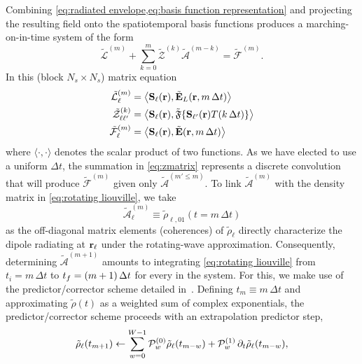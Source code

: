 Combining \cref{eq:radiated envelope,eq:basis function representation} and projecting the resulting field onto the spatiotemporal basis functions produces a marching-on-in-time system of the form
\begin{equation}
  \tilde{\mathcal{L}}^{(m)} + \sum_{k = 0}^{m} \tilde{\mathcal{Z}}^{(k)} \tilde{\mathcal{A}}^{(m - k)} = \tilde{\mathcal{F}}^{(m)}.
  \label{eq:zmatrix}
\end{equation}
In this (block $N_s \times N_s$) matrix equation
\begin{subequations}
  \begin{align}
    \tilde{\mathcal{L}}^{(m)}_{\ell} &= \big\langle \mathbf{S}_\ell(\vb{r}), \tilde{\vb{E}}_L(\vb{r}, m \, \Delta t) \big\rangle \\
    \tilde{\mathcal{Z}}^{(k)}_{\ell \ell'} &= \big\langle \mathbf{S}_\ell(\vb{r}), \tilde{\mathfrak{F}}\{ \mathbf{S}_{\ell'}(\mathbf{r}) T(k \, \Delta t) \} \big\rangle \\
    \tilde{\mathcal{F}}^{(m)}_\ell &= \big\langle \mathbf{S}_\ell(\vb{r}), \tilde{\mathbf{E}}(\vb{r}, m \, \Delta t) \big\rangle
  \end{align}
  \label{eq:projections}
\end{subequations}
where $\langle \cdot, \cdot \rangle$ denotes the scalar product of two functions.
As we have elected to use a uniform $\Delta t$, the summation in \cref{eq:zmatrix} represents a discrete convolution that will produce $\tilde{\mathcal{F}}^{(m)}$ given only $\tilde{\mathcal{A}}^{(m' \leqslant m)}$.
To link $\tilde{\mathcal{A}}^{(m)}$ with the density matrix in \cref{eq:rotating liouville}, we take
\begin{equation}
  \tilde{\mathcal{A}}^{(m)}_\ell \equiv \tilde{\rho}_{\ell, 01}(t = m \, \Delta t)
  \label{eq:polarization definition}
\end{equation}
as the off-diagonal matrix elements (coherences) of $\tilde{\rho}_{\ell}$ directly characterize the dipole radiating at $\vb{r}_\ell$ under the rotating-wave approximation.
Consequently, determining $\tilde{\mathcal{A}}^{(m + 1)}$ amounts to integrating \cref{eq:rotating liouville} from $t_i = m \, \Delta t$ to $t_f = \qty(m + 1) \, \Delta t$ for every \qd{} in the system.
For this, we make use of the predictor/corrector scheme detailed in~\cite{Glaser2009}.
Defining $t_m \equiv m \, \Delta t$ and approximating $\tilde{\rho}(t)$ as a weighted sum of complex exponentials, the predictor/corrector scheme proceeds with an extrapolation predictor step,
\begin{equation}
  \tilde{\rho}_\ell(t_{m + 1}) \leftarrow \sum_{w = 0}^{W-1} \mathcal{P}_w^{\qty(0)} \tilde{\rho}_\ell(t_{m-w}) + \mathcal{P}_w^{\qty(1)} \, \partial_t \tilde{\rho}_\ell(t_{m-w}),
  \label{eq:predictor ch}
\end{equation}
